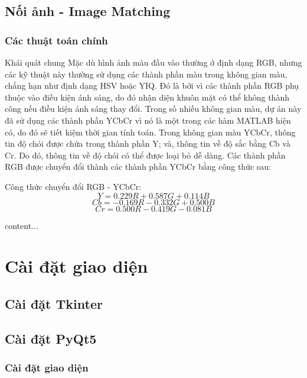 \documentclass[10.5pt]{beamer}
\begin{document}
\subsection{\fontsize{8.5pt}{9.5pt}\selectfont Nối ảnh - Image Matching}
\begin{frame}
	\frametitle{\fontsize{11.5pt}{12.5pt}\selectfont Các thuật toán chính}
		\begin{center}
			\begin{block}{\fontsize{9pt}{10.5pt}\selectfont Khái quát chung}
			\fontsize{7.5pt}{10.5pt}\selectfont Mặc dù hình ảnh màu đầu vào thường ở định dạng RGB, nhưng các kỹ thuật này thường sử dụng các thành phần màu trong không gian màu, chẳng hạn như định dạng HSV hoặc YIQ. Đó là bởi vì các thành phần RGB phụ thuộc vào điều kiện ánh sáng, do đó nhận diện khuôn mặt có thể không thành công nếu điều kiện ánh sáng thay đổi. Trong số nhiều không gian màu, dự án này đã sử dụng các thành phần YCbCr vì nó là một trong các hàm MATLAB hiện có, do đó sẽ tiết kiệm thời gian tính toán. Trong không gian màu YCbCr, thông tin độ chói được chứa trong thành phần Y; và, thông tin về độ sắc bằng Cb và Cr. Do đó, thông tin về độ chói có thể được loại bỏ dễ dàng. Các thành phần RGB được chuyển đổi thành các thành phần YCbCr bằng công thức sau:
		\end{block}
		\begin{block} {\fontsize{9pt}{10.5pt}\selectfont Công thức chuyển đổi RGB - YCbCr: }
			\fontsize{6.5pt}{7.5pt}\selectfont
			\[Y = 0.229R + 0.587G + 0.114B\]
			\[Cb =  - 0.169R - 0.332G + 0.500B\]
			\[Cr = 0.500R - 0.419G - 0.081B\]
		\end{block}
		\end{center}
\end{frame}
\begin{frame}
	content...
\end{frame}

\section{\fontsize{8.5pt}{9.5pt}\selectfont Cài đặt giao diện}
\subsection{\fontsize{8.5pt}{9.5pt}\selectfont Cài đặt Tkinter}
\subsection{\fontsize{8.5pt}{9.5pt}\selectfont Cài đặt PyQt5}
\begin{frame}
	\frametitle{\fontsize{11.5pt}{12.5pt}\selectfont Cài đặt giao diện}
\end{frame}
\end{document}
